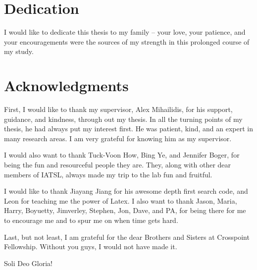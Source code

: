 \documentclass{ut-thesis}
\begin{document}
\begin{preliminary}
\section*{Dedication}
I would like to dedicate this thesis to my family -- your love, your patience, and your encouragements were the sources of my strength in this prolonged course of my study.


\section*{Acknowledgments}
First, I would like to thank my supervisor, Alex Mihailidis, for his support, guidance, and kindness, through out my thesis.  In all the turning points of my thesis, he had always put my interest first.  He was patient, kind, and an expert in many research areas.  I am very grateful for knowing him as my supervisor.

I would also want to thank Tuck-Voon How, Bing Ye, and Jennifer Boger, for being the fun and resourceful people they are.  They, along with other dear members of IATSL, always made my trip to the lab fun and fruitful.

I would like to thank Jiayang Jiang for his awesome depth first search code, and Leon for teaching me the power of Latex.  I also want to thank Jason, Maria, Harry, Boyuetty, Jimverley, Stephen, Jon, Dave, and PA, for being there for me to encourage me and to spur me on when time gets hard.

Last, but not least, I am grateful for the dear Brothers and Sisters at Crosspoint Fellowship.  Without you guys, I would not have made it.

Soli Deo Gloria!


\listoffigures
\listoftables



\end{preliminary}
\end{document}
